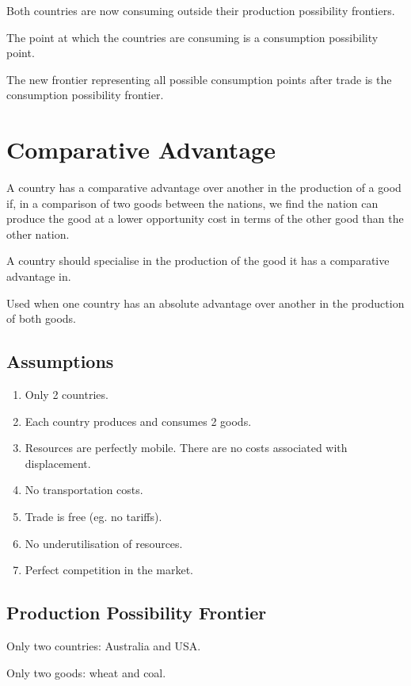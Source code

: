 \documentclass[a4paper,11pt]{article}
\begin{document}
Both countries are now consuming outside their production possibility frontiers.

The point at which the countries are consuming is a consumption possibility
point.

The new frontier representing all possible consumption points after trade is
the consumption possibility frontier.




\section{Comparative Advantage}

A country has a comparative advantage over another in the production of a good
if, in a comparison of two goods between the nations, we find the nation can
produce the good at a lower opportunity cost in terms of the other good than
the other nation.

A country should specialise in the production of the good it has a comparative
advantage in.

Used when one country has an absolute advantage over another in the production
of both goods.


\subsection{Assumptions}

\begin{enumerate}
\item Only 2 countries.
\item Each country produces and consumes 2 goods.
\item Resources are perfectly mobile. There are no costs associated with
displacement.
\item No transportation costs.
\item Trade is free (eg. no tariffs).
\item No underutilisation of resources.
\item Perfect competition in the market.
\end{enumerate}


\subsection{Production Possibility Frontier}

Only two countries: Australia and USA.

Only two goods: wheat and coal.
\end{document}

